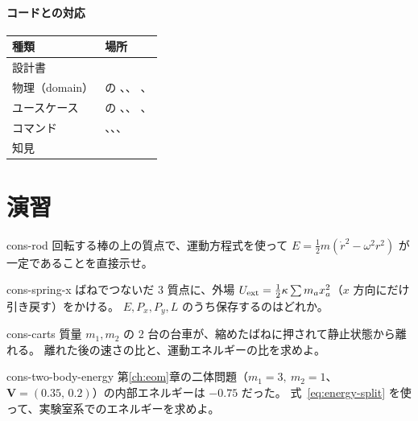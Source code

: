\paragraph{コードとの対応}
\begin{center}
\begin{tabularx}{\linewidth}{@{}lL@{}}
\toprule
種類 & 場所 \\
\midrule
設計書 &  \\
物理（domain） &  の 、、
  、 \\
ユースケース &  の 、、
  、 \\
コマンド & 、、、 \\
知見 &  \\
\bottomrule
\end{tabularx}
\end{center}

\section{演習}\label{sec:cons-exercises}

\begin{exercise}[基礎]{cons-rod}
回転する棒の上の質点で、運動方程式を使って $E=\tfrac12m(\dot r^2-\omega^2r^2)$ が一定であることを直接示せ。
\end{exercise}

\begin{exercise}[基礎]{cons-spring-x}
ばねでつないだ 3 質点に、外場 $U_{\rm ext}=\tfrac12\kappa\sum m_ax_a^2$（$x$ 方向にだけ引き戻す）をかける。
$E,P_x,P_y,L$ のうち保存するのはどれか。
\end{exercise}

\begin{exercise}[基礎]{cons-carts}
質量 $m_1,m_2$ の 2 台の台車が、縮めたばねに押されて静止状態から離れる。
離れた後の速さの比と、運動エネルギーの比を求めよ。
\end{exercise}

\begin{exercise}[応用]{cons-two-body-energy}
第\ref{ch:eom}章の二体問題（$m_1=3,\ m_2=1$、$\bm V=(0.35,\,0.2)$）の内部エネルギーは $-0.75$ だった。
式~\eqref{eq:energy-split} を使って、実験室系でのエネルギーを求めよ。
\end{exercise}

